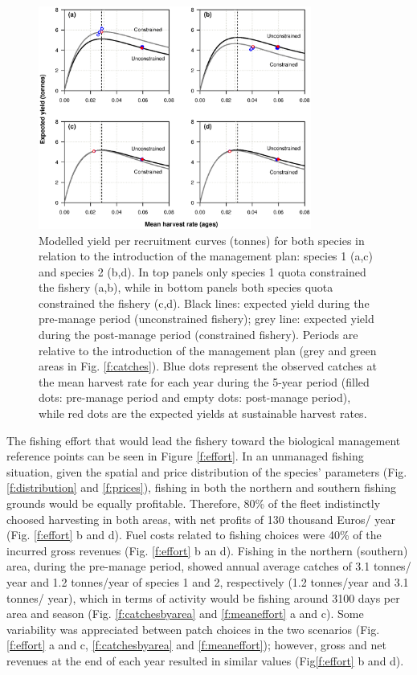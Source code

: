 \documentclass[12pt,oneline,a4paper,numbib]{ouparticle}
\numberwithin{equation}{subsection} %
\begin{document}
\begin{figure}[!ht]
\centering
\includegraphics[width=0.8\textwidth]{Figures/Yields.eps} 
\caption{Modelled yield per recruitment curves (tonnes) for both species in relation to the introduction of the management plan: species 1 (a,c) and species 2 (b,d). In top panels only species 1 quota constrained the fishery (a,b), while in bottom panels both species quota constrained the fishery (c,d). Black lines: expected yield during the pre-manage period (unconstrained fishery); grey line: expected yield during the post-manage period (constrained fishery). Periods are relative to the introduction of the management plan (grey and green areas in Fig. \ref{f:catches}). Blue dots represent the observed catches at the mean harvest rate for each year during the 5-year period (filled dots: pre-manage period and empty dots: post-manage period), while red dots are the expected yields at sustainable harvest rates.}
\label{f:yields}
\end{figure}

The fishing effort that would lead the fishery toward the biological management reference points can be seen in Figure \ref{f:effort}. In an unmanaged fishing situation, given the spatial and price distribution of the species' parameters (Fig. \ref{f:distribution} and \ref{f:prices}), fishing in both the northern and southern fishing grounds would be equally profitable. Therefore, 80\% of the fleet indistinctly choosed harvesting in both areas, with net profits of 130 thousand Euros/ year (Fig. \ref{f:effort} b and d). Fuel costs related to fishing choices were 40\% of the incurred gross revenues (Fig. \ref{f:effort} b an d). Fishing in the northern (southern) area, during the pre-manage period, showed annual average catches of 3.1 tonnes/ year and 1.2 tonnes/year of species 1 and 2, respectively (1.2 tonnes/year and 3.1 tonnes/ year), which in terms of activity would be fishing around 3100 days per area and season (Fig. \ref{f:catchesbyarea} and \ref{f:meaneffort} a and c). Some variability was appreciated between patch choices in the two scenarios (Fig. \ref{f:effort} a and c, \ref{f:catchesbyarea} and \ref{f:meaneffort}); however, gross and net revenues at the end of each year resulted in similar values (Fig\ref{f:effort} b and d). 
\end{document}
